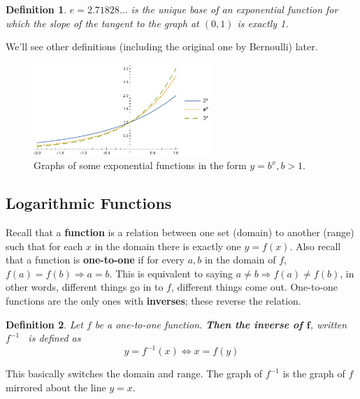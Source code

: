\documentclass[letterpaper, 11pt, openany]{book}
\theoremstyle{mytheoremstyle}
\newtheorem{definition}{Definition}[section]
\theoremstyle{myexamplestyle}
\begin{document}
\begin{definition}\label{d:Eulers-number}
    \(e = 2.71828\ldots\) is the unique base of an exponential function for which the slope of the tangent to the graph at \((0,1)\) is exactly 1.
\end{definition}
We'll see other definitions (including the original one by Bernoulli) later.
\begin{figure}[htbp]
    \centering
        \includegraphics[width=0.6\textwidth]{Figures/expfunctions.pdf}
    \caption{Graphs of some exponential functions in the form $y = b^{x},b > 1$.}
    \label{f:expfunctions}
\end{figure}

\subsection{Logarithmic Functions}
Recall that a \textbf{function} is a relation between one set (domain) to another (range) such that for each $x$ in the domain there is exactly one $y = f(x)$. Also recall that a function is \textbf{one-to-one} if for every $a, b$ in the domain of $f$, $f(a) = f(b) \Rightarrow a = b$. This is equivalent to saying $a \neq b \Rightarrow f(a) \neq f(b)$, in other words, different things go in to $f$, different things come out. One-to-one functions are the only ones with \textbf{inverses}; these reverse the relation.

\begin{definition}\label{d:inverse-function}
    Let \(f\) be a one-to-one function. \textbf{Then the inverse of \(\bm{f}\)}, written \(f^{-1}\) \faFrown \ is defined as
    \[y = f^{-1}(x) \Leftrightarrow x = f(y)\]
\end{definition}
This basically switches the domain and range. The graph of $f^{-1}$ is the graph of $f$ mirrored about the line $y = x$.
\end{document}
